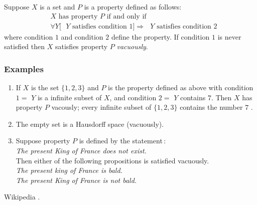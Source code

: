 \documentclass[12pt]{article}
\begin{document}
Suppose $X$ is a set and $P$ is a property defined as follows:
\begin{eqnarray*}
& &  \mbox{$X$ has property $P$ if and only if} \\
& &  \mbox{$\forall Y[$ $Y$ satisfies condition $1] \Rightarrow$ $Y$ satisfies condition $2$ }
\end{eqnarray*} 
where condition $1$ and condition $2$ define the property. 
If condition $1$ is never satisfied then $X$ satisfies property $P$
\emph{vacuously}.

\subsubsection*{Examples}
\begin{enumerate}
\item If $X$ is the set $\{1,2,3\}$ and $P$ is the property defined as above with condition $1=$ $Y$ is a infinite subset of $X$, and condition $2=$ $Y$ contains $7$.  Then $X$ has property $P$ vacously; every infinite subset of $\{1,2,3\}$ contains the number $7$ \cite{wiki}. 
\item The empty set is a Hausdorff space (vacuously). 
\item Suppose property $P$ is defined by the statement\,: \\
\emph{The present King of France does not exist.}\\
Then either of the following propositions is satisfied vacuously. \\
\emph{The present king of France is bald.}\\
\emph{The present King of France is not bald.} 
\end{enumerate}

\begin{thebibliography}{9}
Wikipedia .
\end{thebibliography}
\end{document}
